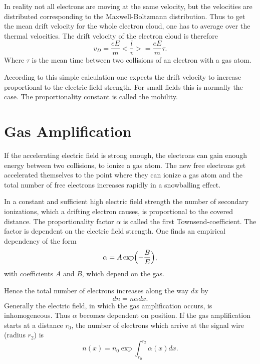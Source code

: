 \documentclass[12pt]{article}
\begin{document}
In reality not all electrons are moving at the same velocity, but the velocities are distributed corresponding to the Maxwell-Boltzmann distribution. Thus to get the mean drift velocity for the whole electron cloud, one has to average over the thermal velocities. The drift velocity of the electron cloud is therefore
\begin{equation}
v_D = \frac{eE}{m} < \frac{l}{v} > = \frac{eE}{m} \tau.
\end{equation}
Where $\tau$ is the mean time between two collisions of an electron with a gas atom.

According to this simple calculation one expects the drift velocity to increase proportional to the electric field strength. For small fields this is normally the case. The proportionality constant is called the mobility.

\section{Gas Amplification}

If the accelerating electric field is strong enough, the electrons can gain enough energy between two collisions, to ionize a gas atom. The new free electrons get accelerated themselves to the point where they can ionize a gas atom and the total number of free electrons increases rapidly in a snowballing effect. 

In a constant and sufficient high electric field strength the number of secondary ionizations, which a drifting electron causes, is proportional to the covered distance. The proportionality factor $\alpha$ is called the first Townsend-coefficient. The factor is dependent on the electric field strength. One finds an empirical dependency of the form
\begin{equation}
\alpha = A \exp \Bigl( - \frac{B}{E} \Bigr),
\label{eq:townsend}
\end{equation}
with coefficients $A$ and $B$, which depend on the gas. 

Hence the total number of electrons increases along the way $dx$ by
\begin{equation}
dn = n \alpha dx.
\end{equation}
Generally the electric field, in which the gas amplification occurs, is inhomogeneous. Thus $\alpha$ becomes dependent on position. If the gas amplification starts at a distance $r_0$, the number of electrons which arrive at the signal wire (radius $r_2$) is 
\begin{equation}
n(x) = n_0 \exp \int_{r_0}^{r_2} \alpha(x) dx.
\end{equation}
\end{document}
